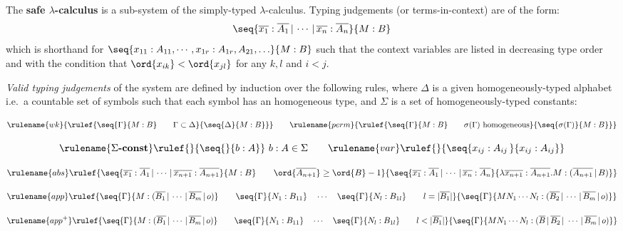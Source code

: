 The \textbf{safe $\lambda$-calculus} is a sub-system of the
simply-typed $\lambda$-calculus. Typing judgements (or
terms-in-context) are of the form:
\begin{equation}
\nonumber \seq{\overline{x_1}:\overline{A_1} \, | \, \cdots \, | \,
\overline{x_n} :  \overline{A_n}}{M : B}
\end{equation}
which is shorthand for $\seq{x_{11} : A_{11}, \cdots, x_{1r}:
A_{1r}, A_{21},\ldots }{M : B}$ such that the context variables are listed in decreasing type order and
 with the condition that $\ord{x_{ik}} < \ord{x_{jl}}$ for any $k, l$ and $i<j$.

\emph{Valid typing judgements} of the system are defined by
induction over the following rules, where $\Delta$ is a given
homogeneously-typed alphabet i.e.\ a countable set of symbols such that each
symbol has an homogeneous type, and $\Sigma$ is a set of homogeneously-typed
constants:

$$ \rulename{wk}
    {   \rulef{ \seq{\Gamma}{M:B} \qquad {\Gamma \subset \Delta} }
             { \seq{\Delta }{M : B}}
   }
\qquad
    \rulename{perm}
    {
      \rulef { \seq{\Gamma}{M:B} \qquad \sigma(\Gamma) \hbox{ homogeneous} }
            { \seq{\sigma(\Gamma)}{M : B} }
    }
$$

$$ \rulename{\Sigma\mbox{\textbf{-const}}}  \rulef{}{\seq{}{b : A}}\ b:A \in \Sigma
\qquad
 \rulename{var} \rulef{}{\seq{x_{ij} : A_{ij}\, }{x_{ij} : A_{ij}}}
$$

$$\rulename{abs}
\rulef{
 {\seq{\overline{x_1} : \overline{A_1}\, | \, \cdots\, | \, \overline{x_{n+1}} : \overline{A_{n+1}}}{M : B}}            \qquad \ord{\overline{A_{n+1}}} \geq \ord{B} -1
 }
 { \seq{\overline{x_1} : \overline{A_1}\, | \, \cdots\, | \, \overline{x_{n}} : \overline{A_{n}}}
     { \lambda \overline{x_{n+1}} : \overline{A_{n+1}} .M : (\overline{A_{n+1}} \, | \, B)  }
 }
$$

$$ \rulename{app} \rulef{{\seq{\Gamma}{M : (\overline{B_1} \, | \, \cdots \, | \, \overline{B_m} \, | \, o)} \qquad
\seq{\Gamma}{N_1 : B_{11}} \quad \cdots \quad \seq{\Gamma}{N_{l} :
B_{1l}} \qquad l = |\overline{B_1}| }}
    { \seq{\Gamma}{M N_1
\cdots N_{l} : (\overline{B_2} \, | \, \cdots \, | \,
\overline{B_m} \, | \, o)}} $$

$$ \rulename{app^+} \rulef
    {\seq{\Gamma}{M : (\overline{B_1} \, | \, \cdots \, | \, \overline{B_m} \, | \, o)} \qquad
    \seq{\Gamma}{N_1 : B_{11}} \quad \cdots \quad \seq{\Gamma}{N_{l} :
    B_{1l}} \qquad l < |\overline{B_1}| }
    { \seq{\Gamma}{M N_1
    \cdots N_{l} : (\overline{B} \, | \, \overline{B_2} \, | \ \cdots \, | \,
    \overline{B_m} \, | \, o)}} $$

